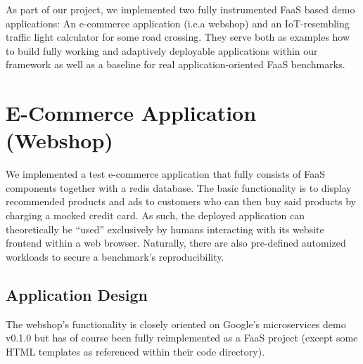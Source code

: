 \documentclass[../main.tex]{subfiles}
\begin{document}
As part of our project, we implemented two fully instrumented FaaS based demo applications:
An e-commerce application (i.e.\@ a webshop) and an IoT-resembling traffic light calculator for some road crossing.
They serve both as examples how to build fully working and adaptively deployable applications 
within our framework as well as a baseline for real application-oriented FaaS benchmarks.

\section{E-Commerce Application (Webshop)}\label{sec:webshop}

We implemented a test e-commerce application that fully consists of FaaS components together with a redis database. 
The basic functionality is to display recommended products and ads to customers 
who can then buy said products by charging a mocked credit card. 
As such, the deployed application can theoretically be ``used'' exclusively by humans 
interacting with its website frontend within a web browser.
Naturally, there are also pre-defined automized workloads to secure a benchmark's reproducibility.

\subsection{Application Design}\label{ssec:webshopApplicationStructure}

The webshop's functionality is closely oriented on Google’s microservices demo v0.1.0\footnotemark{} 
but has of course been fully reimplemented as a FaaS project (except some HTML templates as referenced within their code directory). 
\end{document}
